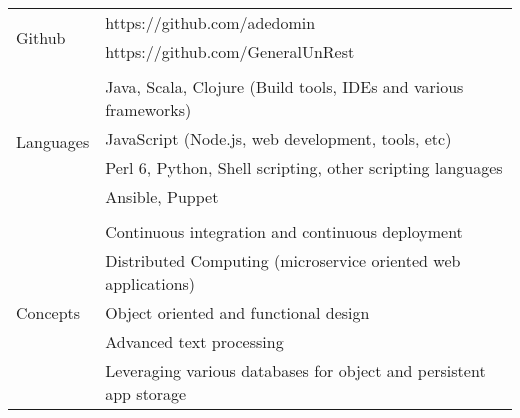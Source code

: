 \documentclass[10pt,letterpaper,]{article}
\begin{document}
\begin{center}
\begin{tabular}{l|l}
    \multirow{2}{*}{Github} & https://github.com/adedomin \\
                            & https://github.com/GeneralUnRest \\
    \\
    \multirow{4}{*}{Languages} & Java, Scala, Clojure (Build tools, IDEs and various frameworks) \\
                               & JavaScript (Node.js, web development, tools, etc) \\
                               & Perl 6, Python, Shell scripting, other scripting languages \\
                               & Ansible, Puppet \\
    \\
    \multirow{5}{*}{Concepts} & Continuous integration and continuous deployment \\
                              & Distributed Computing (microservice oriented web applications) \\
                              & Object oriented and functional design \\
                              & Advanced text processing \\
                              & Leveraging various databases for object and persistent app storage \\
\end{tabular}
\end{center}
\end{document}
